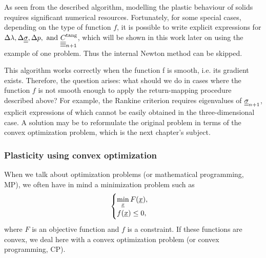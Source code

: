 \documentclass[12pt]{article}
\begin{document}
As seen from the described algorithm, modelling the plastic behaviour of solids requires significant numerical resources. Fortunately, for some special cases, depending on the type of function $f$, it is possible to write explicit expressions for $\Delta\lambda, \Delta\underline{\underline{\sigma}}, \Delta p,  \text{ and } \underline{\underline{\underline{\underline{C_{}}}}}_{n+1}^\text{tang}$, which will be shown in this work later on using the example of one problem. Thus the internal Newton method can be skipped.



This algorithm works correctly when the function f is smooth, i.e. its gradient exists. Therefore, the question arises: what should we do in cases where the function $f$ is not smooth enough to apply the return-mapping procedure described above? For example, the Rankine criterion requires eigenvalues of $\underline{\underline{\sigma}}_{n+1}$, explicit expressions of which cannot be easily obtained in the three-dimensional case. A solution may be to reformulate the original problem in terms of the convex optimization problem, which is the next chapter's subject.


\subsubsection{Plasticity using convex optimization}
\label{sec:theory:convex_optimization}

When we talk about optimization problems (or mathematical programming, MP), we often have in mind a minimization problem such as
\begin{equation}
    \begin{cases}
        \min\limits_{\underline{x}} F(\underline{x}),\\
        f(\underline{x}) \leq 0,
    \end{cases}
\end{equation}
where $F$ is an objective function and $f$ is a constraint. If these functions are convex, we deal here with a convex optimization problem (or convex programming, CP). 
\end{document}
